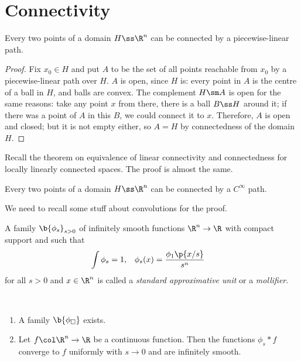 \documentclass[a4paper, 12pt]{article}
\begin{document}
\section{Connectivity}

\begin{lemma}
  Every two points of a domain $H \ss \R^n$ can be connected by a piecewise-linear path.  
\end{lemma}

\begin{proof}
  Fix $x_0 \in H$ and put $A$ to be the set of all points reachable from $x_0$ by a piecewise-linear path over $H$. $A$ is open, since $H$ is: every point in $A$ is the centre of a ball in $H$, and balls are convex. The complement $H \sm A$ is open for the same reasons: take any point $x$ from there, there is a ball $B \ss H$ around it; if there was a point of $A$ in this $B$, we could connect it to $x$. Therefore, $A$ is open and closed; but it is not empty either, so $A = H$ by connectedness of the domain $H$.
\end{proof}

Recall the theorem on equivalence of linear connectivity and connectedness for locally linearly connected spaces. The proof is almost the same.

\begin{theorem}
  Every two points of a domain $H \ss \R^n$ can be connected by a $C^\infty$ path.   
\end{theorem}

We need to recall some stuff about convolutions for the proof.

\begin{definition}
  A family $\b{\phi_s}_{s > 0}$ of infinitely smooth functions $\R^n \to \R$ with compact support and such that
  \begin{align*}
    \int \phi_s &= 1, &
    \phi_s(x) &= \frac{\phi_1\p{x/s}}{s^n}
  \end{align*}
  for all $s > 0$ and $x \in \R^n$ is called a
  \emph{standard approximative unit} or a \emph{mollifier}.
\end{definition}

\begin{theorem}
  ~\begin{enumerate}
    \item A family $\b{\phi_\square}$ exists.
    \item Let $f \col \R^n \to \R$ be a continuous function.
  Then the functions $\phi_s * f$ converge to $f$ uniformly with $s \to 0$ and are infinitely smooth.
  \end{enumerate}
\end{theorem}
\end{document}
